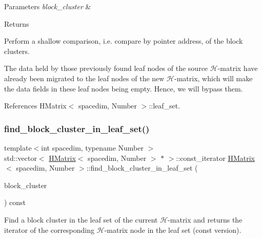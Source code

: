 \begin{DoxyParams}{Parameters}
{\em block\+\_\+cluster} & \\
\hline
\end{DoxyParams}
\begin{DoxyReturn}{Returns}

\end{DoxyReturn}
Perform a shallow comparison, i.\+e. compare by pointer address, of the block clusters.


\begin{DoxyDescription}
\item[Note ]The data held by those previously found leaf nodes of the source $\mathcal{H}$-\/matrix have already been migrated to the leaf nodes of the new $\mathcal{H}$-\/matrix, which will make the data fields in these leaf nodes being empty. Hence, we will bypass them. 
\end{DoxyDescription}

References H\+Matrix$<$ spacedim, Number $>$\+::leaf\+\_\+set.

\mbox{\label{classHMatrix_a723cc200afe31148fcc28f0120c5ec54}} 
\subsubsection{\texorpdfstring{find\+\_\+block\+\_\+cluster\+\_\+in\+\_\+leaf\+\_\+set()}{find\_block\_cluster\_in\_leaf\_set()}\hspace{0.1cm}{\footnotesize\ttfamily [2/2]}}
{\footnotesize\ttfamily template$<$int spacedim, typename Number $>$ \\
std\+::vector$<$ \hyperlink{classHMatrix}{H\+Matrix}$<$ spacedim, Number $>$ $\ast$ $>$\+::const\+\_\+iterator \hyperlink{classHMatrix}{H\+Matrix}$<$ spacedim, Number $>$\+::find\+\_\+block\+\_\+cluster\+\_\+in\+\_\+leaf\+\_\+set (\begin{DoxyParamCaption}\item[{const \hyperlink{classBlockCluster}{Block\+Cluster}$<$ spacedim, Number $>$ \&}]{block\+\_\+cluster }\end{DoxyParamCaption}) const}

Find a block cluster in the leaf set of the current $\mathcal{H}$-\/matrix and returns the iterator of the corresponding $\mathcal{H}$-\/matrix node in the leaf set (const version).


